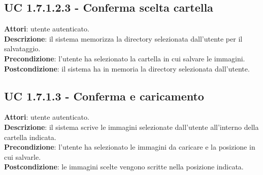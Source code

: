 		\subsection{UC 1.7.1.2.3 - Conferma scelta cartella}{
			\label{uc1.7.1.2.3}
			\textbf{Attori}: utente autenticato.	\\
			\textbf{Descrizione}: il sistema memorizza la directory selezionata dall'utente per il salvataggio. \\
			\textbf{Precondizione}: l'utente ha selezionato la cartella in cui salvare le immagini.	\\
			\textbf{Postcondizione}: il sistema ha in memoria la directory selezionata dall'utente.	\\
			}
	\subsection{UC 1.7.1.3 - Conferma e caricamento}{
		\label{uc1.7.1.3}
		\textbf{Attori}: utente autenticato.\\
		\textbf{Descrizione}: il sistema scrive le immagini selezionate dall'utente all'interno della cartella indicata. \\
		\textbf{Precondizione}: l'utente ha selezionato le immagini da caricare e la posizione in cui salvarle.	\\
		\textbf{Postcondizione}: le immagini scelte vengono scritte nella posizione indicata.	\\
		}

